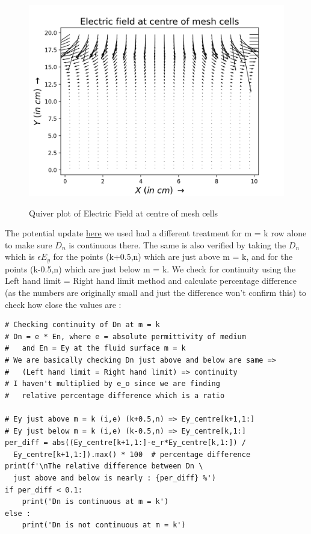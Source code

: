 \documentclass[11pt, a4paper]{article}
\begin{document}
\begin{figure}[H]
  \centering
  \includegraphics[scale=0.6]{EF_middle.png}
  \label{fig:EF_middle}
  \caption{Quiver plot of Electric Field at centre of mesh cells}
\end{figure}
The potential update \hyperref[eq:1]{here} we used had a different treatment for m = k row alone to make sure $D_n$ is continuous there.
The same is also verified by taking the $D_n$ which is $\epsilon E_y$ for the points (k+0.5,n) which are just above m = k,
and for the points (k-0.5,n) which are just below m = k. We check for continuity using the Left hand limit = Right hand limit method
and calculate percentage difference (as the numbers are originally small and just the difference won't confirm this) to check how close the values are :
\begin{verbatim}
# Checking continuity of Dn at m = k
# Dn = e * En, where e = absolute permittivity of medium 
#   and En = Ey at the fluid surface m = k
# We are basically checking Dn just above and below are same =>
#   (Left hand limit = Right hand limit) => continuity
# I haven't multiplied by e_o since we are finding 
#   relative percentage difference which is a ratio

# Ey just above m = k (i,e) (k+0.5,n) => Ey_centre[k+1,1:]
# Ey just below m = k (i,e) (k-0.5,n) => Ey_centre[k,1:]
per_diff = abs((Ey_centre[k+1,1:]-e_r*Ey_centre[k,1:]) /
  Ey_centre[k+1,1:]).max() * 100  # percentage difference
print(f'\nThe relative difference between Dn \
  just above and below is nearly : {per_diff} %')
if per_diff < 0.1:
    print('Dn is continuous at m = k')
else :
    print('Dn is not continuous at m = k')
\end{verbatim}
\end{document}
